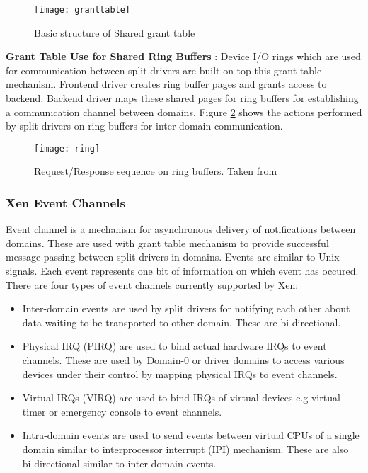 \begin{figure}[!htbp]
	\centering
	\texttt{[image: granttable]}
	\caption{Basic structure of Shared grant table}
	\label{granttable}
\end{figure}
\textbf{Grant Table Use for Shared Ring Buffers} : 
Device I/O rings which are used for communication between split drivers are built on top this grant table mechanism. Frontend driver creates ring buffer pages and grants access to backend. Backend driver maps these shared pages for ring buffers for establishing a communication channel between domains. Figure \ref{ring} shows the actions performed by split drivers on ring buffers for inter-domain communication.

\begin{figure}[!htbp]
	\centering
	\texttt{[image: ring]}
	\caption{Request/Response sequence on ring buffers. Taken from \cite{xen_book}}
	\label{ring}
\end{figure}

\subsubsection{Xen Event Channels\label{sec:eventchannel}}
Event channel is a mechanism for asynchronous delivery of notifications between domains. These are used with grant table mechanism to provide successful message passing between split drivers in domains. Events are similar to Unix signals. Each event represents one bit of information on which event has occured. There are four types of event channels currently supported by Xen:
\begin{itemize}
	\item Inter-domain events are used by split drivers for notifying each other about data waiting to be transported to other domain. These are bi-directional.
	\item Physical IRQ (PIRQ) are used to bind actual hardware IRQs to event channels. These are used by Domain-0 or driver domains to access various devices under their control by mapping physical IRQs to event channels.
	\item Virtual IRQs (VIRQ) are used to bind IRQs of virtual devices e.g virtual timer or emergency console to event channels.
	\item Intra-domain events are used to send events between virtual CPUs of a single domain similar to interprocessor interrupt (IPI) mechanism. These are also bi-directional similar to inter-domain events.
\end{itemize}

